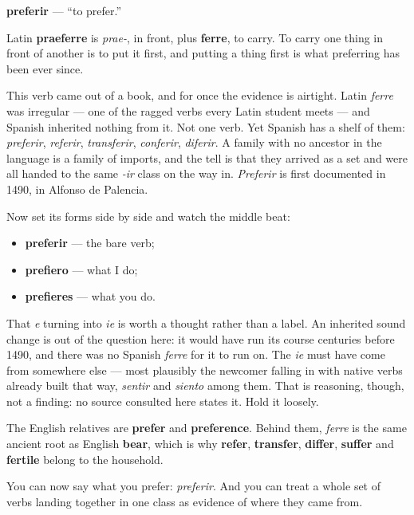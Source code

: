\begin{cousinweb}
\textbf{preferir} — \textquotedblleft{}to prefer.\textquotedblright{}

Latin \textbf{praeferre} is \emph{prae-}, in front, plus \textbf{ferre}, to carry. To carry one thing in front of another is to put it first, and putting a thing first is what preferring has been ever since.

This verb came out of a book, and for once the evidence is airtight. Latin \emph{ferre} was irregular — one of the ragged verbs every Latin student meets — and Spanish inherited nothing from it. Not one verb. Yet Spanish has a shelf of them: \emph{preferir}, \emph{referir}, \emph{transferir}, \emph{conferir}, \emph{diferir}. A family with no ancestor in the language is a family of imports, and the tell is that they arrived as a set and were all handed to the same \emph{-ir} class on the way in. \emph{Preferir} is first documented in 1490, in Alfonso de Palencia.

Now set its forms side by side and watch the middle beat:

\begin{itemize}
\raggedright
  \item \textbf{preferir} — the bare verb;
  \item \textbf{prefiero} — what I do;
  \item \textbf{prefieres} — what you do.
\end{itemize}

That \emph{e} turning into \emph{ie} is worth a thought rather than a label. An inherited sound change is out of the question here: it would have run its course centuries before 1490, and there was no Spanish \emph{ferre} for it to run on. The \emph{ie} must have come from somewhere else — most plausibly the newcomer falling in with native verbs already built that way, \emph{sentir} and \emph{siento} among them. That is reasoning, though, not a finding: no source consulted here states it. Hold it loosely.

The English relatives are \textbf{prefer} and \textbf{preference}. Behind them, \emph{ferre} is the same ancient root as English \textbf{bear}, which is why \textbf{refer}, \textbf{transfer}, \textbf{differ}, \textbf{suffer} and \textbf{fertile} belong to the household.
\end{cousinweb}

\begin{grammarlens}[title={What you've built}]
You can now say what you prefer: \emph{preferir}. And you can treat a whole set of verbs landing together in one class as evidence of where they came from.
\end{grammarlens}

